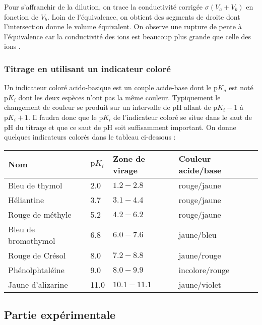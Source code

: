 \documentclass{tp}
\newcommand{\pKa}{\ensuremath{\mathrm{p}K_a}}
\begin{document}
Pour s'affranchir de la dilution, on trace la conductivité corrigée $\sigma(V_a+V_b)$ en fonction de $V_b$. Loin de l'équivalence, on obtient des segments de droite dont l'intersection donne le volume équivalent. On observe une rupture de pente à l'équivalence car la conductivité des ions  est beaucoup plus grande que celle des ions .

\subsubsection{Titrage en utilisant un indicateur coloré}%
\label{ssub:titrage_en_utilisant_un_indicateur_colore}

Un indicateur coloré acido-basique est un couple acide-base dont le $\pKa$ est noté $\mathrm{p}K_i$ dont les deux espèces n'ont pas la même couleur. Typiquement le changement de couleur se produit sur un intervalle de pH allant de $\mathrm{p}K_i-1$ à $\mathrm{p}K_i+1$. Il faudra donc que le $\mathrm{p}K_i$ de l'indicateur coloré se situe dans le saut de pH du titrage et que ce saut de pH soit suffisamment important. On donne quelques indicateurs colorés dans le tableau ci-dessous :
\begin{center}
  \begin{tabular}{llll}
    \toprule
    Nom &  $\mathrm{p}K_i$ & Zone de virage & Couleur acide/base \\
    \midrule
    Bleu de thymol & \num{2.0} & $\num{1.2}-\num{2.8}$ & rouge/jaune \\
    Héliantine & \num{3.7} & $\num{3.1}-\num{4.4}$ & rouge/jaune \\
    Rouge de méthyle & \num{5.2} & $\num{4.2}-\num{6.2}$ & rouge/jaune \\
    Bleu de bromothymol & \num{6.8} & $\num{6.0}-\num{7.6}$ & jaune/bleu \\
    Rouge de Crésol & \num{8.0} & $\num{7.2}-\num{8.8}$ & jaune/rouge \\
    Phénolphtaléine & \num{9.0} & $\num{8.0}-\num{9.9}$ & incolore/rouge \\
    Jaune d'alizarine & \num{11.0} & $\num{10.1}-\num{11.1}$ & jaune/violet\\
    \bottomrule
  \end{tabular}
\end{center}

\subsection{Partie expérimentale}%
\label{sub:partie_experimentale}
\end{document}
